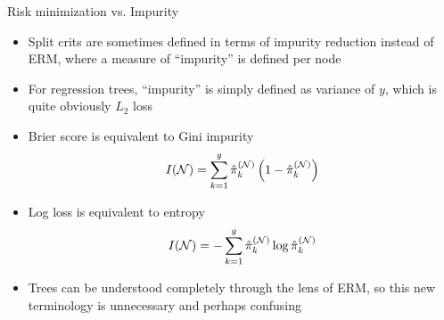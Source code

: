 \documentclass[11pt,compress,t,notes=noshow, xcolor=table]{beamer}
\begin{document}
\begin{vbframe}{Risk minimization vs. Impurity}

\begin{itemize}
\item Split crits are sometimes defined in terms of impurity reduction instead of ERM, where a measure of ``impurity'' is defined per node
\item For regression trees, \enquote{impurity} is simply defined as variance of $y$, which is quite obviously $L_2$ loss

\item Brier score is equivalent to Gini impurity
$$I(\mathcal{N}) = \sum\limits_{k=1}^g \hat\pi_k^{(\mathcal{N})} \left( 1-\hat\pi_k^{(\mathcal{N})} \right)$$
\item Log loss is equivalent to entropy
$$I(\mathcal{N}) = -\sum\limits_{k=1}^g \hat\pi_k^{(\mathcal{N})} \log \hat\pi_k^{(\mathcal{N})}$$
\item Trees can be understood completely through the lens of ERM, so this new terminology is unnecessary and perhaps confusing
\end{itemize}
\end{vbframe}
\end{document}
